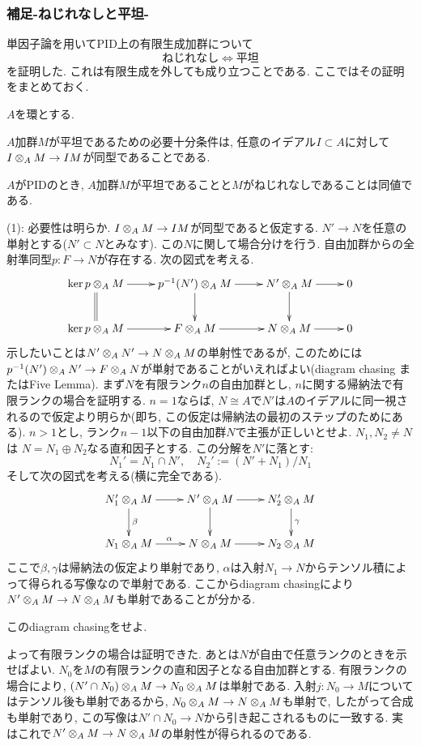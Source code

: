 \subsubsection*{補足-ねじれなしと平坦-}
{\small
単因子論を用いてPID上の有限生成加群について
\[ねじれなし\iff 平坦\]
を証明した. これは有限生成を外しても成り立つことである. ここではその証明をまとめておく.
\begin{theo} $A$を環とする.
\ben
\item $A$加群$M$が平坦であるための必要十分条件は, 任意のイデアル$I\subset A$に対して$I\mathbin{\otimes}_{A} M \to IM$が同型であることである.
\item $A$がPIDのとき, $A$加群$M$が平坦であることと$M$がねじれなしであることは同値である.
\een
\end{theo}
\prf
(1): 必要性は明らか. $I\mathbin{\otimes}_{A}M\to IM$が同型であると仮定する. $N'\to N$を任意の単射とする($N'\subset N$とみなす). この$N$に関して場合分けを行う. 自由加群からの全射準同型$p:F\to N$が存在する.  次の図式を考える.
\[
\xymatrix{
\ker{p}\tens_{A}M \ar@{=}[d] \ar[r]& p^{-1}(N')\tens_{A}M \ar[d] \ar[r] & N'\tens_{A} M\ar[d] \ar[r] & 0\\
\ker{p}\tens_{A} M \ar[r]&F\tens_{A}M  \ar[r]& N\tens_{A}M \ar[r]& 0
}
\]
示したいことは$N'\mathbin{\otimes}_{A} N' \to N\mathbin{\otimes}_{A}M$の単射性であるが, このためには$p^{-1}(N')\mathbin{\otimes}_{A} N' \to F\mathbin{\otimes}_{A}N$が単射であることがいえればよい(diagram chasing またはFive Lemma).  まず$N$を有限ランク$n$の自由加群とし, $n$に関する帰納法で有限ランクの場合を証明する. $n=1$ならば, $N\cong A$で$N'$は$A$のイデアルに同一視されるので仮定より明らか(即ち, この仮定は帰納法の最初のステップのためにある). $n>1$とし, ランク$n-1$以下の自由加群$N$で主張が正しいとせよ. $N_1,N_2\neq N$は $N = N_1\oplus N_2$なる直和因子とする. この分解を$N'$に落とす:
\[N_1' = N_1\cap N',\quad N_2':= (N'+N_1)/N_1 \]
そして次の図式を考える(横に完全である).
\[
\xymatrix{
N_1'\tens_{A}M \ar[r]\ar[d]^{\beta} &N'\tens_{A}M\ar[d]\ar[r]& N_2'\tens_{A}M\ar[d]^{\gamma} \\
N_1\tens_{A}M \ar[r]^{\alpha} & N\tens_{A}M \ar[r] & N_2\tens_{A}M
}
\]
ここで$\beta,\gamma$は帰納法の仮定より単射であり, $\alpha$は入射$N_1\to N$からテンソル積によって得られる写像なので単射である. ここからdiagram chasingにより$N'\mathbin{\otimes}_{A}M \to N\mathbin{\otimes}_{A}M$も単射であることが分かる.
\begin{prac}
このdiagram chasingをせよ.
\end{prac}
よって有限ランクの場合は証明できた. あとは$N$が自由で任意ランクのときを示せばよい. $N_0$を$M$の有限ランクの直和因子となる自由加群とする. 有限ランクの場合により, $(N'\cap N_0)\mathbin{\otimes}_{A}M \to N_0 \mathbin{\otimes}_{A}M$は単射である.
入射$j:N_0\to M$についてはテンソル後も単射であるから, $N_0\mathbin{\otimes}_{A}M \to N\mathbin{\otimes}_{A}M$も単射で, したがって合成も単射であり, この写像は$N'\cap N_0 \to N$から引き起こされるものに一致する. 実はこれで$N'\mathbin{\otimes}_{A}M \to N\mathbin{\otimes}_{A}M$の単射性が得られるのである.

}
